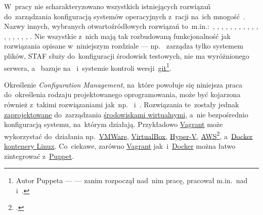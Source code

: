 \documentclass[thesis]{subfiles}
\begin{document}
W~pracy nie scharakteryzowano wszystkich istniejących rozwiązań do~zarządzania konfiguracją systemów operacyjnych z~racji na~ich mnogość~\cite{wiki:scm-comparison}. Nazwy innych, wybranych otwartoźródłowych rozwiązań to~m.in.:~, , \emph{\isconf{}}, , , , , , , , \emph{\radmind{}}, , \emph{\rudder{}}, , , , , . Nie wszystkie z~nich mają tak rozbudowaną funkcjonalność jak rozwiązania opisane w~niniejszym rozdziale --- np.~\radmind{} zarządza tylko systemem plików, STAF służy do~konfiguracji środowisk testowych, \isconf{} nie ma wyróżnionego serwera, a~\rudder{} bazuje na~\cfengine{} i~systemie kontroli wersji~\href{https://en.wikipedia.org/wiki/Git}{git}\footnote{Autor Puppeta --- \emph{\puppetauthor} --- zanim rozpoczął nad~nim pracę, pracował m.in.~nad~\isconf{} i~\cfengine{}.}.

Określenie \emph{Configuration Management}, na~które powołuje się niniejsza praca do~określenia rodzaju projektowanego oprogramowania, może być kojarzona również z~takimi rozwiązaniami jak~np.~ i~. Rozwiązania te~zostały jednak \href{http://stackoverflow.com/questions/16647069/should-i-use-vagrant-or-docker-for-creating-an-isolated-environment}{zaprojektowane} do~zarządzania \href{http://stackoverflow.com/questions/16047306/how-is-docker-different-from-a-normal-virtual-machine}{środowiskami wirtualnymi}, a~nie bezpośrednio konfiguracją systemu, na~którym działają. Przykładowo \href{https://www.vagrantup.com/intro/index.html}{Vagrant} może wykorzystać do~działania np.~\href{https://en.wikipedia.org/wiki/VMware}{VMWare}, \href{https://en.wikipedia.org/wiki/VirtualBox}{VirtualBox}, \href{https://en.wikipedia.org/wiki/Hyper-V}{Hyper-V}, \href{https://en.wikipedia.org/wiki/Amazon_Web_Services}{AWS}\footnote{.}, a~\href{https://www.docker.com/what-docker}{Docker} \href{https://en.wikipedia.org/wiki/Linux_containers}{kontenery Linux}. Co~ciekawe, zarówno \href{https://www.vagrantup.com/docs/provisioning/puppet_apply.html}{Vagrant} jak~i~\href{https://puppet.com/presentations/using-docker-puppet-james-turnbull-kickstarter}{Docker} można łatwo zintegrować z~\hyperref[sec:puppet]{Puppet}.
\end{document}
